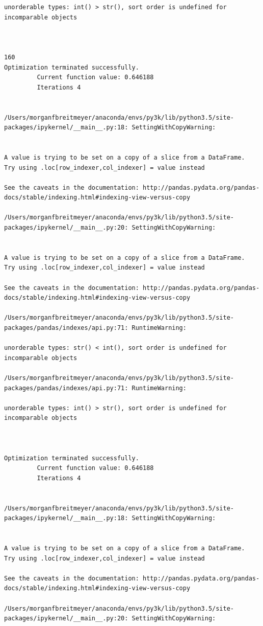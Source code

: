 \begin{lstlisting}
unorderable types: int() > str(), sort order is undefined for incomparable objects



160
Optimization terminated successfully.
         Current function value: 0.646188
         Iterations 4


/Users/morganfbreitmeyer/anaconda/envs/py3k/lib/python3.5/site-packages/ipykernel/__main__.py:18: SettingWithCopyWarning:


A value is trying to be set on a copy of a slice from a DataFrame.
Try using .loc[row_indexer,col_indexer] = value instead

See the caveats in the documentation: http://pandas.pydata.org/pandas-docs/stable/indexing.html#indexing-view-versus-copy

/Users/morganfbreitmeyer/anaconda/envs/py3k/lib/python3.5/site-packages/ipykernel/__main__.py:20: SettingWithCopyWarning:


A value is trying to be set on a copy of a slice from a DataFrame.
Try using .loc[row_indexer,col_indexer] = value instead

See the caveats in the documentation: http://pandas.pydata.org/pandas-docs/stable/indexing.html#indexing-view-versus-copy

/Users/morganfbreitmeyer/anaconda/envs/py3k/lib/python3.5/site-packages/pandas/indexes/api.py:71: RuntimeWarning:

unorderable types: str() < int(), sort order is undefined for incomparable objects

/Users/morganfbreitmeyer/anaconda/envs/py3k/lib/python3.5/site-packages/pandas/indexes/api.py:71: RuntimeWarning:

unorderable types: int() > str(), sort order is undefined for incomparable objects



Optimization terminated successfully.
         Current function value: 0.646188
         Iterations 4


/Users/morganfbreitmeyer/anaconda/envs/py3k/lib/python3.5/site-packages/ipykernel/__main__.py:18: SettingWithCopyWarning:


A value is trying to be set on a copy of a slice from a DataFrame.
Try using .loc[row_indexer,col_indexer] = value instead

See the caveats in the documentation: http://pandas.pydata.org/pandas-docs/stable/indexing.html#indexing-view-versus-copy

/Users/morganfbreitmeyer/anaconda/envs/py3k/lib/python3.5/site-packages/ipykernel/__main__.py:20: SettingWithCopyWarning:



\end{lstlisting}
